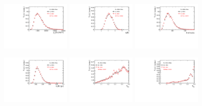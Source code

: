 \begin{figure}[h]
\centering
\includegraphics[height=!,width=0.3\textwidth]{figs/dataVsMC/finalState2_norm/Ds2all_Bs_PT.pdf}
\includegraphics[height=!,width=0.3\textwidth]{figs/dataVsMC/finalState2_norm/Ds2all_Bs_ETA.pdf}
\includegraphics[height=!,width=0.3\textwidth]{figs/dataVsMC/finalState2_norm/Ds2all_NTracks.pdf}

\includegraphics[height=!,width=0.3\textwidth]{figs/dataVsMC/finalState2_norm/Ds2all_Bs_BsDTF_TAUERR.pdf}
\includegraphics[height=!,width=0.3\textwidth]{figs/dataVsMC/finalState2_norm/Ds2all_OS_Combination_PROB.pdf}
\includegraphics[height=!,width=0.3\textwidth]{figs/dataVsMC/finalState2_norm/Ds2all_SS_Kaon_PROB.pdf}


\end{figure}
